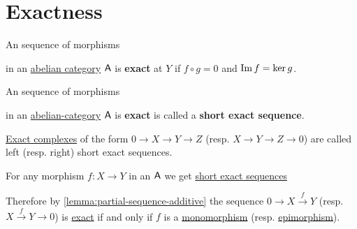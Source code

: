 \documentclass[../../../main]{subfiles}
\begin{document}
\section{Exactness}

\begin{definition} \label{def:exact-complex-sequence}
  An sequence of morphisms
  \begin{center}
  \end{center}
  in an \hyperref[def:abelian-category]{abelian category} \(\mathsf{A}\) is \textbf{exact} at \(Y\) if \(f \circ g = 0\) and \(\operatorname*{Im} f = \ker g\).
\end{definition}


\begin{definition} \label{def:short-exact-sequence}
  An sequence of morphisms
  \begin{center}
  \end{center}
  in an \hyperref[def:abelian-category]{abelian-category} \(\mathsf{A}\) is \textbf{exact}
  is called a \textbf{short exact sequence}.

  \hyperref[def:exact-complex]{Exact complexes} of the form \(0 \to X \to Y \to Z\) (resp. \(X \to Y \to  Z \to 0\)) are called left (resp. right) short exact sequences.
\end{definition}

\begin{remark} \label{remark:exactness-mono-epi}
  For any morphism \(f: X \to Y\) in an \(\mathsf{A}\) we get \hyperref[def:short-exact-sequence]{short exact sequences}
  \begin{center}
  \end{center}

  Therefore by \autoref{lemma:partial-sequence-additive} the sequence \(0 \to X \xrightarrow{f} Y\) (resp. \(X \xrightarrow{f} Y \to 0\)) is \hyperref[def:exact-complex-sequence]{exact} if and only if \(f\) is a \hyperref[def:mono-epi-morphism]{monomorphism} (resp. \hyperref[def:mono-epi-morphism]{epimorphism}).
\end{remark}
\end{document}
